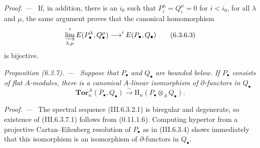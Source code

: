 \documentclass[10pt,oneside]{book}
\newcommand{\HH}{\mathrm H}
\newcommand{\sref}[2][]{(#2)}
\newenvironment{proposition}[1][]{\par\medskip\noindent\itshape Proposition (#1). ---\ }{\par}
\newenvironment{proof}{\par\medskip\noindent\textit{Proof. ---\ }}{\par}
\begin{document}
\begin{proof}
If, in addition, there is an $i_0$ such that
$P_i^\lambda=Q_i^\mu=0$ for $i<i_0$, for all $\lambda$ and
$\mu$, the same argument proves that the canonical homomorphism
\[
  \varinjlim_{\lambda,\mu}
  'E(P_\bullet^\lambda,Q_\bullet^\mu)
  \longrightarrow
  'E(P_\bullet,Q_\bullet)
  \tag{6.3.6.3}\label{III.6.3.6.3}
\]
is bijective.
\end{proof}

\begin{proposition}[6.3.7]
\label{III.6.3.7}
Suppose that $P_\bullet$ and $Q_\bullet$ are bounded below.  If
$P_\bullet$ consists of flat $A$-modules, there is a canonical
$A$-linear isomorphism of $\partial$-functors in $Q_\bullet$
\[
  \mathbf{Tor}_n^A(P_\bullet,Q_\bullet)
  \xrightarrow{\ \sim\ }
  \HH_n(P_\bullet\otimes_AQ_\bullet).
  \tag{6.3.7.1}\label{III.6.3.7.1}
\]
\end{proposition}

\begin{proof}
The spectral sequence \sref{III.6.3.2.1} is biregular and
degenerate, so existence of \sref{III.6.3.7.1} follows from
\sref[0]{0.11.1.6}.  Computing hypertor from a projective
Cartan--Eilenberg resolution of $P_\bullet$ as in
\sref{III.6.3.4} shows immediately that this isomorphism is an
isomorphism of $\partial$-functors in $Q_\bullet$.
\end{proof}
\end{document}
